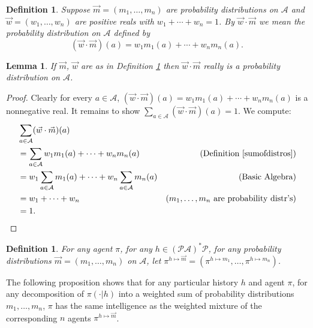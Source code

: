 \documentclass[twoside]{article}
\newtheorem{definition}[theorem]{Definition}
\newtheorem{lemma}[theorem]{Lemma}
\begin{document}
\begin{definition}
\label{sumofdistros}
    Suppose $\vec m=(m_1,\ldots,m_n)$ are probability distributions on $\mathcal A$
    and $\vec w=(w_1,\ldots,w_n)$ are positive reals with
    $w_1+\cdots+w_n=1$. By $\vec w\cdot\vec m$ we mean the probability distribution
    on $\mathcal A$ defined by
    \[
        (\vec w\cdot\vec m)(a) = w_1m_1(a) + \cdots + w_nm_n(a).
    \]
\end{definition}

\begin{lemma}
    If $\vec m$, $\vec w$ are as in Definition \ref{sumofdistros}
    then $\vec w\cdot\vec m$ really is a probability distribution on $\mathcal A$.
\end{lemma}

\begin{proof}
    Clearly for every $a\in\mathcal A$,
    $(\vec w\cdot\vec m)(a) = w_1m_1(a) + \cdots + w_nm_n(a)$ is a nonnegative
    real. It remains to show $\sum_{a\in\mathcal A}(\vec w\cdot\vec m)(a)=1$.
    We compute:
    \begin{align*}
        &{} \sum_{a\in\mathcal A}(\vec w\cdot\vec m)(a)\\
        &=
        \sum_{a\in\mathcal A} w_1m_1(a) + \cdots + w_nm_n(a)
            &\mbox{(Definition \ref{sumofdistros})}\\
        &=
        w_1\sum_{a\in\mathcal A} m_1(a) + \cdots + w_n\sum_{a\in\mathcal A}m_n(a)
            &\mbox{(Basic Algebra)}\\
        &= w_1 + \cdots + w_n
            &\mbox{($m_1,\ldots,m_n$ are probability distr's)}\\
        &= 1.
    \end{align*}
\end{proof}

\begin{definition}
    For any agent $\pi$, for any $h\in(\mathcal P\mathcal A)^*\mathcal P$,
    for any probability distributions $\vec m=(m_1,\ldots,m_n)$ on $\mathcal A$,
    let $\pi^{h\mapsto \vec m}=(\pi^{h\mapsto m_1},\ldots,\pi^{h\mapsto m_n})$.
\end{definition}

The following proposition shows that
for any particular history $h$ and agent $\pi$,
for any decomposition of $\pi(\cdot|h)$ into a weighted sum
of probability distributions $m_1,\ldots,m_n$,
$\pi$ has the same intelligence as the weighted mixture of the corresponding $n$ agents
$\pi^{h\mapsto \vec m}$.
\end{document}
